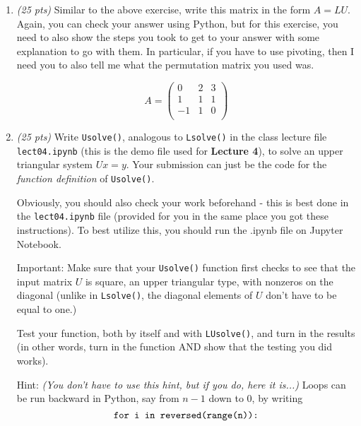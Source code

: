 \documentclass[11pt]{article}
\begin{document}
\begin{enumerate}
\medskip
\item
\textit{(25 pts)} 
Similar to the above exercise, write this matrix in the form $A=LU$. Again, you can check your answer using Python, but for this exercise, you need to also show the steps you took to get to your answer with some explanation to go with them. In particular, if you have to use pivoting, then I need you to also tell me what the permutation matrix you used was.

$$A =
   \left(
   \begin{array}{ccc}
    0 & 2 & 3 \\ 	
    1 & 1 & 1 \\ 
   -1 & 1 & 0 \\
   \end{array} \right)
$$

\medskip
\item
\textit{(25 pts)} Write {\tt Usolve()}, analogous to {\tt Lsolve()} in the class lecture file {\tt lect04.ipynb} (this is the demo file used for \textbf{Lecture 4}), to solve an upper triangular system $Ux=y$. Your submission can just be the code for the \textit{function definition} of {\tt Usolve()}. 

Obviously, you should also check your work beforehand - this is best done in the {\tt lect04.ipynb} file (provided for you in the same place you got these instructions). To best utilize this, you should run the .ipynb file on Jupyter Notebook.

Important: Make sure that your {\tt Usolve()} function first checks to see that the input matrix $U$ is square, an upper triangular type, with nonzeros on the diagonal (unlike in {\tt Lsolve()}, the diagonal elements of $U$ don't have to be equal to one.)

Test your function, both by itself and with {\tt LUsolve()}, and turn in the results (in other words, turn in the function AND show that the testing you did works).

Hint: \textit{(You don't have to use this hint, but if you do, here it is...)} Loops can be run backward in Python, 
say from $n-1$ down to $0$, by writing
$$\mbox{\tt for i in reversed(range(n)):}$$

\end{enumerate}
\end{document}
